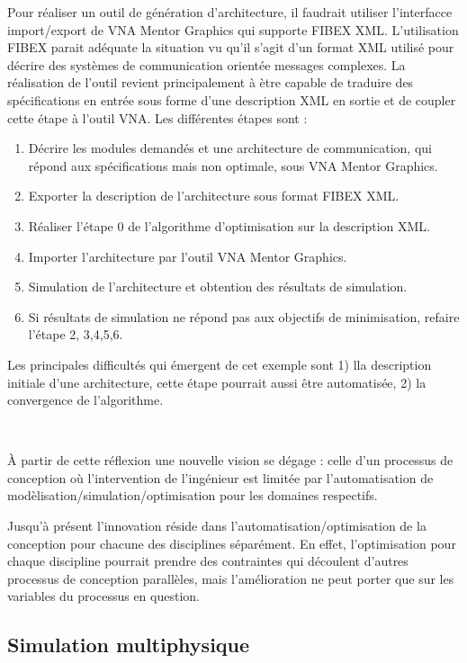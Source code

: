 \documentclass[11pt]{article}
\begin{document}
Pour réaliser un outil de génération d’architecture, il faudrait utiliser l’interfacce import/export de VNA Mentor Graphics qui supporte FIBEX XML. L’utilisation FIBEX parait adéquate la situation vu qu’il s’agit d’un format XML utilisé pour décrire des systèmes de communication orientée messages complexes. La réalisation de l’outil revient principalement à ètre capable de traduire des spécifications en entrée sous forme d’une description XML en sortie et de coupler cette étape à l’outil VNA. Les différentes étapes sont :
\begin{enumerate}
\item Décrire les modules demandés et une architecture de communication, qui répond aux spécifications mais non optimale, sous VNA Mentor Graphics.
\item Exporter la description de l’architecture sous format FIBEX XML.
\item Réaliser l’étape 0 de l’algorithme d’optimisation sur la description XML.
\item Importer l’architecture par l’outil VNA Mentor Graphics.
\item Simulation de l’architecture et obtention des résultats de simulation.
\item Si résultats de simulation ne répond pas aux objectifs de minimisation, refaire l’étape 2, 3,4,5,6.
\end{enumerate}

Les principales difficultés qui émergent de cet  exemple sont 1) lla description initiale d'une architecture, cette étape pourrait aussi être automatisée, 2) la convergence de l'algorithme.

~

\`A partir de cette réflexion une nouvelle vision se dégage : celle d'un processus de conception où l'intervention de l'ingénieur est limitée par l'automatisation de modèlisation/simulation/optimisation pour les domaines respectifs.

Jusqu'à présent l'innovation réside dans l'automatisation/optimisation de la conception pour chacune des disciplines séparément. En effet, l'optimisation pour chaque discipline pourrait prendre des contraintes qui découlent d'autres processus de conception parallèles, mais l'amélioration ne peut porter que sur les variables du processus en question.

\subsection{Simulation multiphysique}
\end{document}

